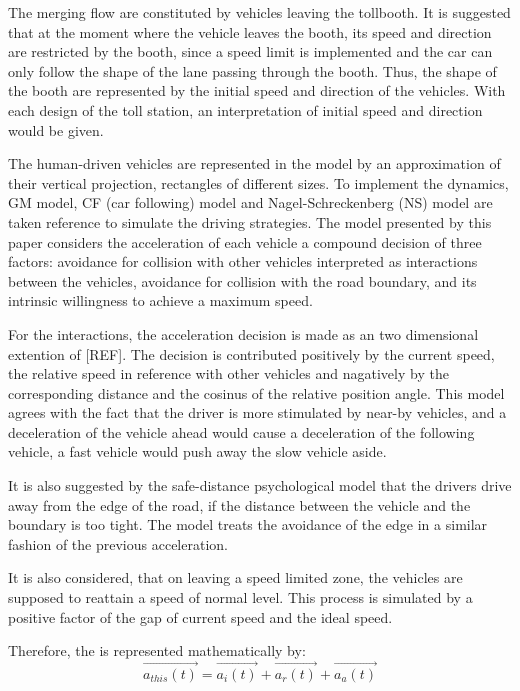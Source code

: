 \documentclass{mcmthesis}
\begin{document}
The merging flow are constituted by vehicles leaving the tollbooth. It is suggested that at the moment where the vehicle leaves the booth, its speed and direction are restricted by the booth, since a speed limit is implemented and the car can only follow the shape of the lane passing through the booth. Thus, the shape of the booth are represented by the initial speed and direction of the vehicles. With each design of the toll station, an interpretation of initial speed and direction would be given.

The human-driven vehicles are represented in the model by an approximation of their vertical projection, rectangles of different sizes. To implement the dynamics, GM model, CF (car following) model and Nagel-Schreckenberg (NS) model \cite{acelluar} are taken reference to simulate the driving strategies. The model presented by this paper considers the acceleration of each vehicle a compound decision of three factors: avoidance for collision with other vehicles interpreted as interactions between the vehicles, avoidance for collision with the road boundary, and its intrinsic willingness to achieve a maximum speed. 

For the interactions, the acceleration decision is made as an two dimensional extention of [REF]. The decision is contributed positively by the current speed, the relative speed in reference with other vehicles and nagatively by the corresponding distance and the cosinus of the relative position angle. This model agrees with the fact that the driver is more stimulated by near-by vehicles, and a deceleration of the vehicle ahead would cause a deceleration of the following vehicle, a fast vehicle would push away the slow vehicle aside.

It is also suggested by the safe-distance psychological model that the drivers drive away from the edge of the road, if the distance between the vehicle and the boundary is too tight. The model treats the avoidance of the edge in a similar fashion of the previous acceleration.

It is also considered, that on leaving a speed limited zone, the vehicles are supposed to reattain a speed of normal level. This process is simulated by a positive factor of the gap of current speed and the ideal speed.

Therefore, the \acceleration is represented mathematically by: 
$$\overrightarrow{a_{this}(t)}=\overrightarrow{a_i(t)}+\overrightarrow{a_r(t)}+\overrightarrow{a_a(t)}$$
\end{document}
